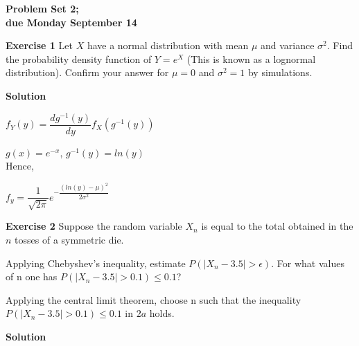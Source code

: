 \documentclass[12pt]{article}
\begin{document}


\begin{center}
\textbf{Problem Set 2;\\
due Monday September 14}
\end{center}

\bigskip
	
\textbf{Exercise 1}		
Let $X$ have a normal distribution with mean $\mu$ and variance $\sigma^2$. Find the 
probability density function of $Y = e^X$ (This is known as a lognormal distribution). 
Confirm your answer for $\mu = 0$ and $\sigma^2 = 1$ by simulations.
\medskip
		
\textbf{Solution}

$f_Y\left(y\right)=\dfrac{dg^{-1}\left(y\right)}{dy}f_X\left(g^{-1}\left(y\right)\right)$

$g\left(x\right)=e^{-x}$, $g^{-1}\left(y\right)=ln\left(y\right)$\\

Hence,

$f_{y}=\dfrac{1}{\sqrt{2\pi}}e^{-\dfrac{\left(ln\left(y\right)-\mu\right)^2}{2\sigma^2}}$

\bigskip

\textbf{Exercise 2}
Suppose the random variable $X_n$ is equal to the total obtained in the $n$ tosses of a symmetric die.
\begin{list}{()~}{}
\item Applying Chebyshev's inequality, estimate $P\left(\left|X_n - 3.5\right| > \epsilon\right)$. For what values of n one has $P\left(\left|X_n - 3.5\right| > 0.1\right)\leq0.1$?
\item Applying the central limit theorem, choose n such that the inequality $P\left(\left|X_n - 3.5\right| > 0.1\right)\leq 0.1$ in $2a$ holds.
\end{list}

\medskip		

\textbf{Solution}
\end{document}
